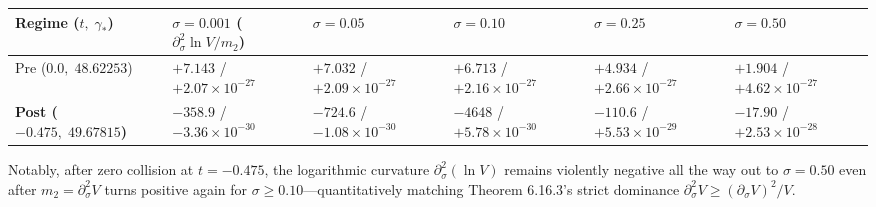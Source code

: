 \documentclass[
  11pt,
]{article}
\newcounter{none} %
\begin{document}
\begin{enumerate}
  {\def\LTcaptype{none} %
  \begin{longtable}[]{@{}
    >{\raggedright\arraybackslash}p{}
    >{\centering\arraybackslash}p{}
    >{\centering\arraybackslash}p{}
    >{\centering\arraybackslash}p{}
    >{\centering\arraybackslash}p{}
    >{\centering\arraybackslash}p{}@{}}
  \toprule\noalign{}
  \begin{minipage}[b]{\linewidth}\raggedright
  Regime (\(t,\; \gamma_*\))
  \end{minipage} & \begin{minipage}[b]{\linewidth}\centering
  \(\sigma = 0.001\) (\(\partial_\sigma^2 \ln V / m_2\))
  \end{minipage} & \begin{minipage}[b]{\linewidth}\centering
  \(\sigma = 0.05\)
  \end{minipage} & \begin{minipage}[b]{\linewidth}\centering
  \(\sigma = 0.10\)
  \end{minipage} & \begin{minipage}[b]{\linewidth}\centering
  \(\sigma = 0.25\)
  \end{minipage} & \begin{minipage}[b]{\linewidth}\centering
  \(\sigma = 0.50\)
  \end{minipage} \\
  \midrule\noalign{}
  \endhead
  \bottomrule\noalign{}
  \endlastfoot
  Pre (\(0.0,\; 48.62253\)) & \(+7.143\) / \(+2.07\times 10^{-27}\) &
  \(+7.032\) / \(+2.09\times 10^{-27}\) & \(+6.713\) /
  \(+2.16\times 10^{-27}\) & \(+4.934\) / \(+2.66\times 10^{-27}\) &
  \(+1.904\) / \(+4.62\times 10^{-27}\) \\
  \textbf{Post (\(-0.475,\; 49.67815\))} & \textbf{\(-358.9\)} /
  \(-3.36\times 10^{-30}\) & \textbf{\(-724.6\)} /
  \(-1.08\times 10^{-30}\) & \textbf{\(-4648\)} /
  \(+5.78\times 10^{-30}\) & \textbf{\(-110.6\)} /
  \(+5.53\times 10^{-29}\) & \textbf{\(-17.90\)} /
  \(+2.53\times 10^{-28}\) \\
  \end{longtable}
  }

  Notably, after zero collision at \(t = -0.475\), the logarithmic
  curvature \(\partial_\sigma^2(\ln V)\) remains violently negative all
  the way out to \(\sigma = 0.50\) even after
  \(m_2 = \partial_\sigma^2 V\) turns positive again for
  \(\sigma \ge 0.10\)---quantitatively matching Theorem 6.16.3's strict
  dominance \(\partial_\sigma^2 V \ge (\partial_\sigma V)^2 / V\).
\end{enumerate}
\end{document}
